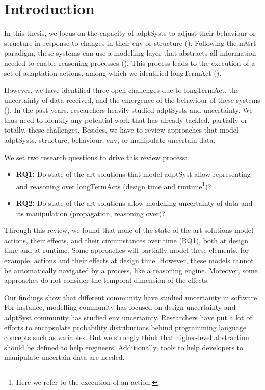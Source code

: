 \section{Introduction}

In this thesis, we focus on the capacity of \glspl{adptSyst} to adjust their \gls{behaviour} or \gls{structure} in response to changes in their \gls{env} or \gls{structure} (\cf {}).
Following the \gls{m@rt} paradigm, these systems can use a modelling layer that abstracts all information needed to enable reasoning processes (\cf {}).
This process leads to the execution of a set of adaptation \glspl{action}, among which we identified \gls{longTermAct} (\cf {}).

However, we have identified three open challenges due to \gls{longTermAct}, the uncertainty of data received, and the emergence of the \gls{behaviour} of these systems (\cf {}).
In the past years, researchers heavily studied \glspl{adptSyst} and uncertainty.
We thus need to identify any potential work that has already tackled, partially or totally, these challenges.
Besides, we have to review approaches that model \glspl{adptSyst}, \gls{structure}, \gls{behaviour}, \gls{env}, or manipulate uncertain data.

We set two research questions to drive this review process:
\begin{itemize}
	\item \textbf{RQ1:} Do state-of-the-art solutions that model \gls{adptSyst} allow representing and reasoning over \glspl{longTermAct} (design time and runtime\footnote{Here we refer to the execution of an \gls{action}.})? 
	\item \textbf{RQ2:} Do state-of-the-art solutions allow modelling uncertainty of data and its manipulation (propagation, reasoning over)? 
\end{itemize} 

Through this review, we found that none of the state-of-the-art solutions model \glspl{action}, their effects, and their \glspl{circumstance} over time (RQ1), both at design time and at runtime.
Some approaches will partially model these elements, for example, \glspl{action} and their effects at design time.
However, these models cannot be automatically navigated by a process, like a reasoning engine.
Moreover, some approaches do not consider the temporal dimension of the effects.

Our findings show that different community have studied uncertainty in software.
For instance, modelling community has focused on design uncertainty and \gls{adptSyst} community has studied \gls{env} uncertainty.
Researchers have put a lot of efforts to encapsulate probability distributions behind programming language concepts such as variables.
But we strongly think that higher-level abstraction should be defined to help engineers.
Additionally, tools to help developers to manipulate uncertain data are needed.

